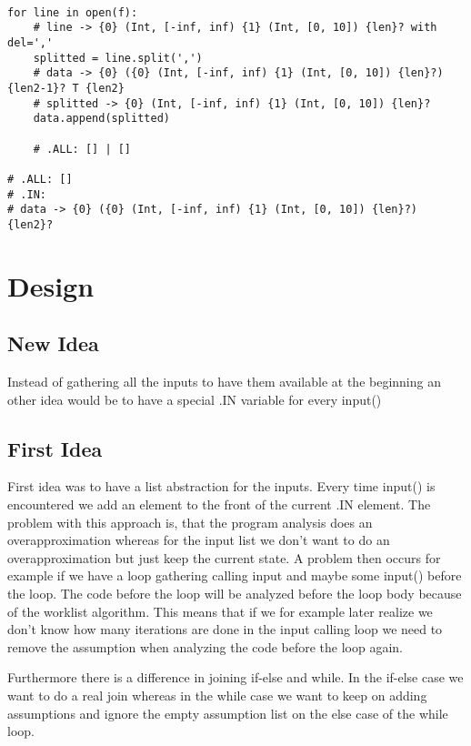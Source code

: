 \documentclass[11pt]{article}
\begin{document}
\begin{lstlisting}

for line in open(f):
    # line -> {0} (Int, [-inf, inf) {1} (Int, [0, 10]) {len}? with del=','
    splitted = line.split(',')
    # data -> {0} ({0} (Int, [-inf, inf) {1} (Int, [0, 10]) {len}?) {len2-1}? T {len2}
    # splitted -> {0} (Int, [-inf, inf) {1} (Int, [0, 10]) {len}?
    data.append(splitted)
    
    # .ALL: [] | []
    
# .ALL: []
# .IN: 
# data -> {0} ({0} (Int, [-inf, inf) {1} (Int, [0, 10]) {len}?) {len2}?
\end{lstlisting}

\section{Design}

\subsection{New Idea}

Instead of gathering all the inputs to have them available at the beginning an other idea would be to have a special .IN variable for every input()

\subsection{First Idea}

First idea was to have a list abstraction for the inputs. Every time input() is encountered we add an element to the front of the current .IN element. The problem with this approach is, that the program analysis does an overapproximation whereas for the input list we don't want to do an overapproximation but just keep the current state. A problem then occurs for example if we have a loop gathering calling input and maybe some input() before the loop. The code before the loop will be analyzed before the loop body because of the worklist algorithm. This means that if we for example later realize we don't know how many iterations are done in the input calling loop we need to remove the assumption when analyzing the code before the loop again. 

Furthermore there is a difference in joining if-else and while. In the if-else case we want to do a real join whereas in the while case we want to keep on adding assumptions and ignore the empty assumption list on the else case of the while loop. 
\end{document}
